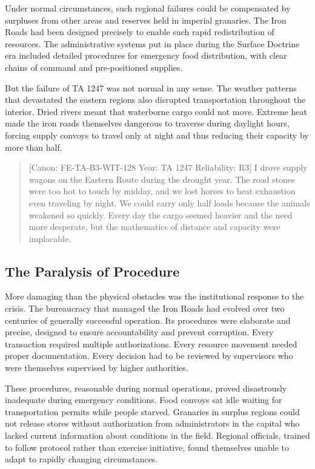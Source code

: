 Under normal circumstances, such regional failures could be compensated
by surpluses from other areas and reserves held in imperial granaries.
The Iron Roads had been designed precisely to enable such rapid
redistribution of resources. The administrative systems put in place
during the Surface Doctrine era included detailed procedures for
emergency food distribution, with clear chains of command and
pre-positioned supplies.

But the failure of TA 1247 was not normal in any sense. The weather
patterns that devastated the eastern regions also disrupted
transportation throughout the interior. Dried rivers meant that
waterborne cargo could not move. Extreme heat made the iron roads
themselves dangerous to traverse during daylight hours, forcing supply
convoys to travel only at night and thus reducing their capacity by more
than half.

\begin{quote}
{[}Canon: FE-TA-B3-WIT-128 \textbar{} Year: TA 1247 \textbar{}
Reliability: R3{]} I drove supply wagons on the Eastern Route during the
drought year. The road stones were too hot to touch by midday, and we
lost horses to heat exhaustion even traveling by night. We could carry
only half loads because the animals weakened so quickly. Every day the
cargo seemed heavier and the need more desperate, but the mathematics of
distance and capacity were implacable.
\end{quote}

\subsection{The Paralysis of
Procedure}\label{the-paralysis-of-procedure}

More damaging than the physical obstacles was the institutional response
to the crisis. The bureaucracy that managed the Iron Roads had evolved
over two centuries of generally successful operation. Its procedures
were elaborate and precise, designed to ensure accountability and
prevent corruption. Every transaction required multiple authorizations.
Every resource movement needed proper documentation. Every decision had
to be reviewed by supervisors who were themselves supervised by higher
authorities.

These procedures, reasonable during normal operations, proved
disastrously inadequate during emergency conditions. Food convoys sat
idle waiting for transportation permits while people starved. Granaries
in surplus regions could not release stores without authorization from
administrators in the capital who lacked current information about
conditions in the field. Regional officials, trained to follow protocol
rather than exercise initiative, found themselves unable to adapt to
rapidly changing circumstances.

